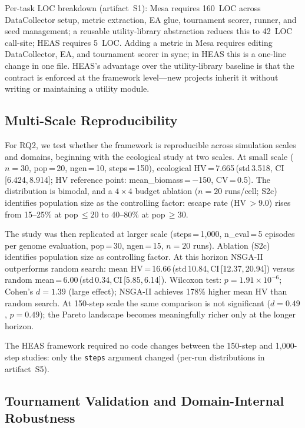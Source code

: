 \documentclass{wscpaperproc}
\begin{document}
Per-task LOC breakdown (artifact~S1): Mesa requires 160~LOC across
DataCollector setup, metric extraction, EA glue, tournament scorer, runner,
and seed management; a reusable utility-library abstraction reduces this to
42~LOC call-site; HEAS requires 5~LOC. Adding a metric in Mesa requires
editing DataCollector, EA, and tournament scorer in sync; in HEAS this is a
one-line change in one file. HEAS's advantage over the utility-library baseline
is that the contract is enforced at the framework level---new projects inherit
it without writing or maintaining a utility module.

\subsection{Multi-Scale Reproducibility}
\label{sec:multiscale}

For RQ2, we test whether the framework is reproducible across simulation
scales and domains, beginning with the ecological study at two scales. At small scale
($n\!=\!30$, pop\,=\,20, ngen\,=\,10, steps\,=\,150),
ecological HV\,=\,7.665\,(std\,3.518, CI\,[6.424,\,8.914]; HV reference point:
mean\_biomass\,=\,$-$150, CV\,=\,0.5).
The distribution is bimodal, and a $4\!\times\!4$ budget ablation
($n\!=\!20$ runs/cell; S2c) identifies population size as the controlling
factor: escape rate (HV\,$>\!9.0$) rises from 15--25\% at pop\,$\le\!20$ to
40--80\% at pop\,$\ge\!30$.

The study was then replicated at larger scale
(steps\,=\,1,000, n\_eval\,=\,5 episodes per genome evaluation, pop\,=\,30,
ngen\,=\,15, $n\!=\!20$ runs). Ablation (S2c) identifies population size as
controlling factor. At this horizon NSGA-II outperforms random search: mean HV\,=\,16.66\,(std\,10.84,\,CI\,[12.37,\,20.94])
versus random mean\,=\,6.00\,(std\,0.34,\,CI\,[5.85,\,6.14]).
Wilcoxon test: $p\!=\!1.91\!\times\!10^{-6}$; Cohen's $d\!=\!1.39$
(large effect); NSGA-II achieves 178\% higher mean HV than random search.
At 150-step scale the same comparison is not significant ($d\!=\!0.49$,
$p\!=\!0.49$); the Pareto landscape becomes meaningfully richer only at the
longer horizon.

The HEAS framework required no code changes between the 150-step
and 1,000-step studies: only the \texttt{steps} argument changed
(per-run distributions in artifact~S5).

\subsection{Tournament Validation and Domain-Internal Robustness}
\label{sec:tournament}
\end{document}
